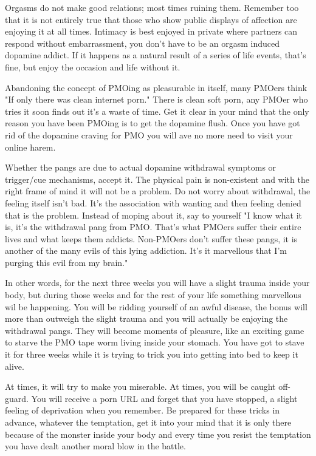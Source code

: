 \documentclass[easypeasy.tex]{subfiles}
\begin{document}
Orgasms do not make good relations; most times ruining them. Remember too that it is not entirely true that those who show public displays of affection are enjoying it at all times. Intimacy is best enjoyed in private where partners can respond without embarrassment, you don't have to be an orgasm induced dopamine addict. If it happens as a natural result of a series of life events, that's fine, but enjoy the occasion and life without it.

Abandoning the concept of PMOing as pleasurable in itself, many PMOers think "If only there was clean internet porn." There is clean soft porn, any PMOer who tries it soon finds out it's a waste of time. Get it clear in your mind that the only reason you have been PMOing is to get the dopamine flush. Once you have got rid of the dopamine craving for PMO you will ave no more need to visit your online harem.

Whether the pangs are due to actual dopamine withdrawal symptoms or trigger/cue mechanisms, accept it. The physical pain is non-existent and with the right frame of mind it will not be a problem. Do not worry about withdrawal, the feeling itself isn't bad. It's the association with wanting and then feeling denied that is the problem. Instead of moping about it, say to yourself "I know what it is, it's the withdrawal pang from PMO. That's what PMOers suffer their entire lives and what keeps them addicts. Non-PMOers don't suffer these pangs, it is another of the many evils of this lying addiction. It's it marvellous that I'm purging this evil from my brain."

In other words, for the next three weeks you will have a slight trauma inside your body, but during those weeks and for the rest of your life something marvellous wil be happening. You will be ridding yourself of an awful disease, the bonus will more than outweigh the slight trauma and you will actually be enjoying the withdrawal pangs. They will become moments of pleasure, like an exciting game to starve the PMO tape worm living inside your stomach. You have got to stave it for three weeks while it is trying to trick you into getting into bed to keep it alive.

At times, it will try to make you miserable. At times, you will be caught off-guard. You will receive a porn URL and forget that you have stopped, a slight feeling of deprivation when you remember. Be prepared for these tricks in advance, whatever the temptation, get it into your mind that it is only there because of the monster inside your body and every time you resist the temptation you have dealt another moral blow in the battle.
\end{document}
